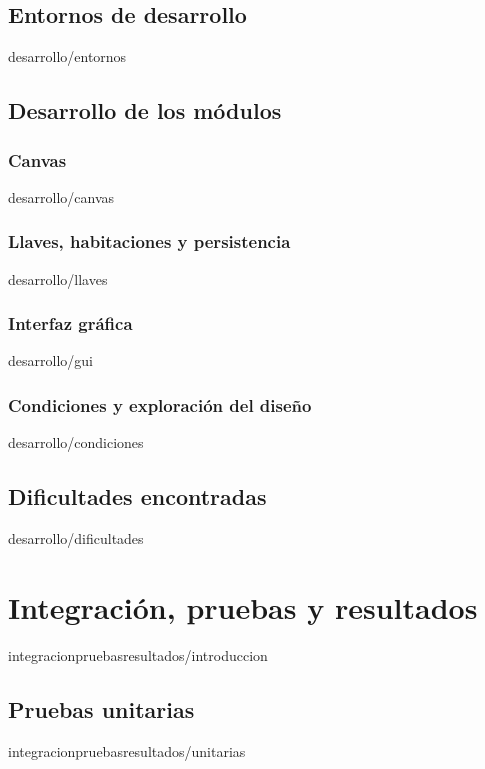 \documentclass[epsbased,lof,loc,copyright,final,extendedindex,firstnumbered,tfg,gnuplot]{tfgtfmthesisuam}
\begin{document}
	\section{Entornos de desarrollo\label{SEC:ENTORNOS}}{desarrollo/entornos}
	\section{Desarrollo de los módulos\label{SEC:DEVMODULOS}}
		\subsection{Canvas\label{SUBSEC:DEVCANVAS}}{desarrollo/canvas}
		\subsection{Llaves, habitaciones y persistencia\label{SUBSEC:DEVLLAVES}}{desarrollo/llaves}
		\subsection{Interfaz gráfica\label{SUBSEC:DEVGUI}}{desarrollo/gui}
		\subsection{Condiciones y exploración del diseño\label{SUBSEC:CONDICIONES}}{desarrollo/condiciones}
	\section{Dificultades encontradas\label{SEC:DIFICULTADES}}{desarrollo/dificultades}

\chapter{Integración, pruebas y resultados\label{CAP:INTEGRACIONPRUEBASYRESULTADOS}}{integracionpruebasresultados/introduccion}
	\section{Pruebas unitarias\label{SEC:PRUEBASUNITARIAS}}{integracionpruebasresultados/unitarias}
\end{document}
